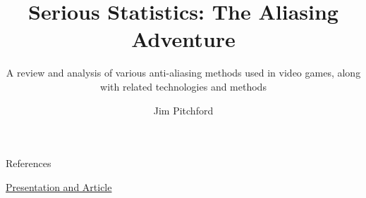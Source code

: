 \documentclass[aspectratio=43, 10.5pt, t]{beamer}
\title{Serious Statistics: The Aliasing Adventure}
\author{Jim Pitchford}
\subtitle{\footnotesize	A review and analysis of various anti-aliasing methods used in video games, along with related technologies and methods}
\newcommand{\changeurlcolor}[1]{\hypersetup{urlcolor=#1}}
\begin{document}
\graphicspath{{Media/}}

\begin{frame}
	\maketitle
\end{frame}















\begin{frame}[allowframebreaks]{References}

	\nocite{*}
	\printbibliography
	
	\begin{center}
	\vfill
		{\changeurlcolor{black}}
		
		\vspace{0.25cm}
		\href{https://github.com/GuestJim/Serious-Statistics-The-Aliasing-Adventure/releases}{Presentation and Article}
	\end{center}
\end{frame}
\end{document}
